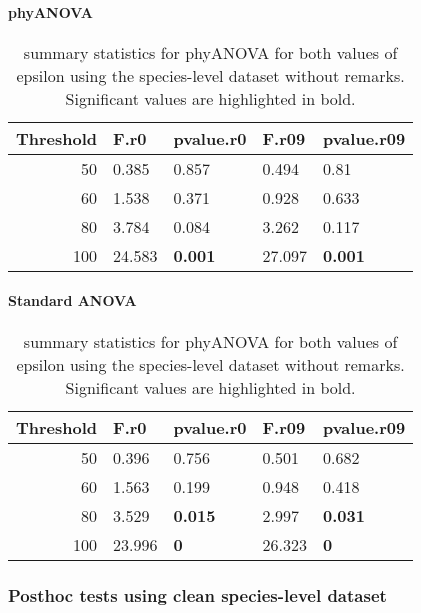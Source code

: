 \documentclass[]{article}
\let\oldparagraph\paragraph
\renewcommand{\paragraph}[1]{\oldparagraph{#1}\mbox{}}
\begin{document}
\hypertarget{phyanova}{%
\paragraph{phyANOVA}\label{phyanova}}

\begin{table}[H]

\caption{\label{tab:unnamed-chunk-4}summary statistics for phyANOVA for both values of epsilon using the species-level dataset without remarks. Significant values are highlighted in bold.}
\centering
\begin{tabular}{r|l|l|l|l}
\hline
Threshold & F.r0 & pvalue.r0 & F.r09 & pvalue.r09\\
\hline
50 & 0.385 & 0.857 & 0.494 & 0.81\\
\hline
60 & 1.538 & 0.371 & 0.928 & 0.633\\
\hline
80 & 3.784 & 0.084 & 3.262 & 0.117\\
\hline
100 & 24.583 & \textbf{0.001} & 27.097 & \textbf{0.001}\\
\hline
\end{tabular}
\end{table}

\hypertarget{standard-anova}{%
\paragraph{Standard ANOVA}\label{standard-anova}}

\begin{table}[H]

\caption{\label{tab:unnamed-chunk-5}summary statistics for phyANOVA for both values of epsilon using the species-level dataset without remarks. Significant values are highlighted in bold.}
\centering
\begin{tabular}{r|l|l|l|l}
\hline
Threshold & F.r0 & pvalue.r0 & F.r09 & pvalue.r09\\
\hline
50 & 0.396 & 0.756 & 0.501 & 0.682\\
\hline
60 & 1.563 & 0.199 & 0.948 & 0.418\\
\hline
80 & 3.529 & \textbf{0.015} & 2.997 & \textbf{0.031}\\
\hline
100 & 23.996 & \textbf{0} & 26.323 & \textbf{0}\\
\hline
\end{tabular}
\end{table}

\hypertarget{posthoc-tests-using-clean-species-level-dataset}{%
\subsubsection{Posthoc tests using clean species-level
dataset}\label{posthoc-tests-using-clean-species-level-dataset}}
\end{document}
